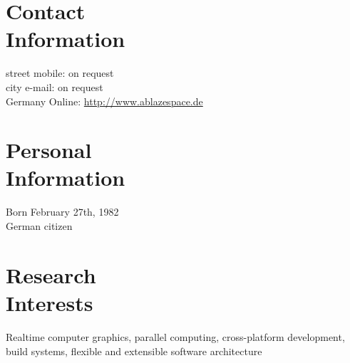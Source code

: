 \documentclass[margin,line]{Ofenberg_Resume}
\begin{document}
\begin{resume}

	\section{\mysidestyle Contact\\Information}

	street											\hfill mobile: on request									\vspace{0mm}\\\vspace{0mm}%
	city										\hfill e-mail: on request	\vspace{0mm}\\\vspace{0mm}%
	Germany													\hfill Online: \url{http://www.ablazespace.de}	\vspace{0mm}\\\vspace{-4.5mm}%


	\section{\mysidestyle Personal\\Information}
	Born February 27th, 1982\\
	German citizen


	\section{\mysidestyle Research\\Interests}

	Realtime computer graphics, parallel computing, cross-platform development,\\
	build systems, flexible and extensible software architecture



\end{resume}
\end{document}
